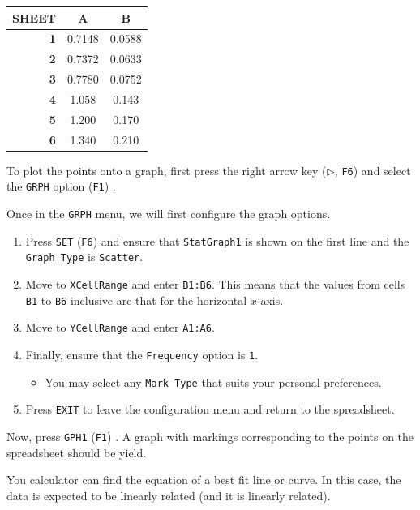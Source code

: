 \documentclass[a5paper,draft]{memoir}
\def\code#1{\texttt{#1}}
\def\Fone{(\code{F1}) }
\def\Fsix{(\code{F6}) }
\begin{document}
\begin{center}
	\setlength{\tabcolsep}{10pt}
	\renewcommand{\arraystretch}{1.2}
	\begin{tabular}{|r|c|c|}
		\hline
		{\tiny SHEET}& \textbf{A}	& \textbf{B} \\
		\hline
		\textbf{1}	& 0.7148		& 0.0588 \\
		\hline
		\textbf{2}	& 0.7372		& 0.0633 \\
		\hline
		\textbf{3}	& 0.7780		& 0.0752 \\
		\hline
		\textbf{4}	& 1.058			& 0.143 \\
		\hline
		\textbf{5}	& 1.200			& 0.170 \\
		\hline
		\textbf{6}	& 1.340			& 0.210 \\
		\hline
	\end{tabular}
\end{center}

To plot the points onto a graph, first press the right arrow key ($\triangleright$, \code{F6}) and select the \code{GRPH} option \Fone.

Once in the \code{GRPH} menu, we will first configure the graph options. 
\begin{enumerate}
	\item Press \code{SET} \Fsix and ensure that \code{StatGraph1} is shown on the first line and the \code{Graph Type} is \code{Scatter}.
	\item Move to \code{XCellRange} and enter \code{B1:B6}. This means that the values from cells \code{B1} to \code{B6} inclusive are that for the horizontal $x$-axis.
	\item Move to \code{YCellRange} and enter \code{A1:A6}.
	\item Finally, ensure that the \code{Frequency} option is \code{1}.
	\begin{itemize}
		\item You may select any \code{Mark Type} that suits your personal preferences.
	\end{itemize}
	\item Press \code{EXIT} to leave the configuration menu and return to the spreadsheet.
\end{enumerate}

Now, press \code{GPH1} \Fone. A graph with markings corresponding to the points on the spreadsheet should be yield.

You calculator can find the equation of a best fit line or curve. In this case, the data is expected to be linearly related (and it is linearly related).
\end{document}
